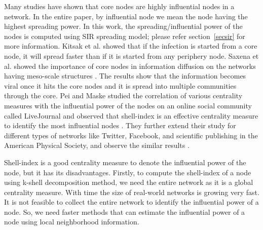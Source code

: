 \documentclass[12pt,3p]{article}
\begin{document}

Many studies have shown that core nodes are highly influential nodes in a network. In the entire paper, by influential node we mean the node having the highest spreading power. In this work, the spreading/influential power of the nodes is computed using SIR spreading model; please refer section~\ref{secsir} for more information. Kitsak et al. \cite{kitsak2010identification} showed that if the infection is started from a core node, it will spread faster than if it is started from any periphery node. Saxena et al. showed the importance of core nodes in information diffusion on the networks having meso-scale structures \cite{saxena2015understanding}. The results show that the information becomes viral once it hits the core nodes and it is spread into multiple communities through the core. Pei and Maske studied the correlation of various centrality measures with the influential power of the nodes on an online social community called LiveJournal and observed that shell-index is an effective centrality measure to identify the most influential nodes \cite{pei2013spreading}. They further extend their study for different types of networks like Twitter, Facebook, and scientific publishing in the American Physical Society, and observe the similar results \cite{pei2014searching}.


Shell-index is a good centrality measure to denote the influential power of the node, but it has its disadvantages. Firstly, to compute the shell-index of a node using k-shell decomposition method, we need the entire network as it is a global centrality measure.  With time the size of real-world networks is growing very fast. It is not feasible to collect the entire network to identify the influential power of a node. So, we need faster methods that can estimate the influential power of a node using local neighborhood information. 
\end{document}
